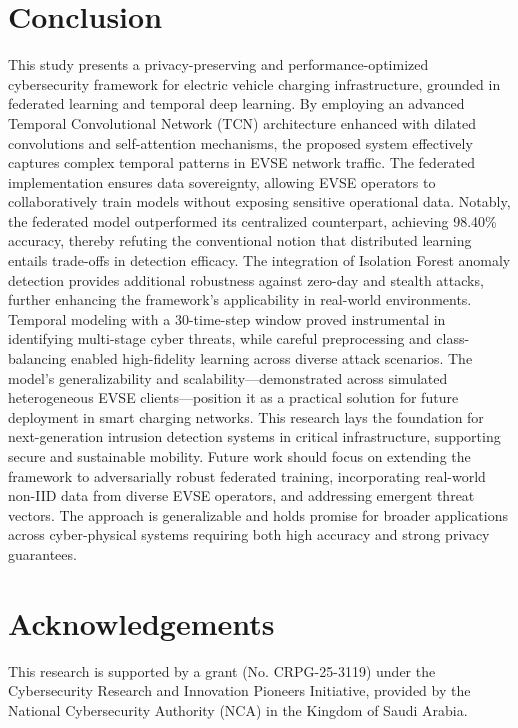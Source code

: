 \documentclass[10pt]{article}
\begin{document}
	\section{Conclusion}
	\label{section:conclusion}
	This study presents a privacy-preserving and performance-optimized cybersecurity framework for electric vehicle charging infrastructure, grounded in federated learning and temporal deep learning. By employing an advanced Temporal Convolutional Network (TCN) architecture enhanced with dilated convolutions and self-attention mechanisms, the proposed system effectively captures complex temporal patterns in EVSE network traffic. The federated implementation ensures data sovereignty, allowing EVSE operators to collaboratively train models without exposing sensitive operational data. Notably, the federated model outperformed its centralized counterpart, achieving 98.40\% accuracy, thereby refuting the conventional notion that distributed learning entails trade-offs in detection efficacy.
	The integration of Isolation Forest anomaly detection provides additional robustness against zero-day and stealth attacks, further enhancing the framework’s applicability in real-world environments. Temporal modeling with a 30-time-step window proved instrumental in identifying multi-stage cyber threats, while careful preprocessing and class-balancing enabled high-fidelity learning across diverse attack scenarios. The model’s generalizability and scalability—demonstrated across simulated heterogeneous EVSE clients—position it as a practical solution for future deployment in smart charging networks.
	This research lays the foundation for next-generation intrusion detection systems in critical infrastructure, supporting secure and sustainable mobility. Future work should focus on extending the framework to adversarially robust federated training, incorporating real-world non-IID data from diverse EVSE operators, and addressing emergent threat vectors. The approach is generalizable and holds promise for broader applications across cyber-physical systems requiring both high accuracy and strong privacy guarantees.
	
	
	\section*{Acknowledgements}
	This research is supported by a grant (No. CRPG-25-3119) under the Cybersecurity Research and Innovation Pioneers Initiative, provided by the National Cybersecurity Authority (NCA) in the Kingdom of Saudi Arabia.
	
\end{document}
